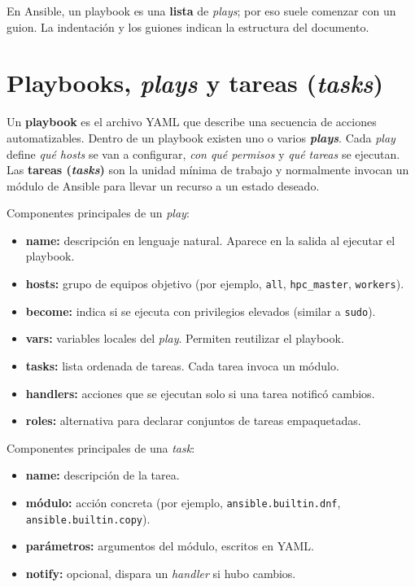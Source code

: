 En Ansible, un playbook es una \textbf{lista} de \textit{plays}; por eso suele comenzar con un guion. La indentación y los guiones indican la estructura del documento. \cite{ansible_playbooks_intro}

\section{Playbooks, \textit{plays} y tareas (\textit{tasks})}
\label{sec:ansible_playbooks_plays_tasks}

Un \textbf{playbook} es el archivo YAML que describe una secuencia de acciones automatizables. Dentro de un playbook existen uno o varios \textbf{\textit{plays}}. Cada \textit{play} define \textit{qué hosts} se van a configurar, \textit{con qué permisos} y \textit{qué tareas} se ejecutan. Las \textbf{tareas (\textit{tasks})} son la unidad mínima de trabajo y normalmente invocan un módulo de Ansible para llevar un recurso a un estado deseado. \cite{ansible_playbooks_intro,ansible_modules_intro}

Componentes principales de un \textit{play}:
\begin{itemize}
  \item \textbf{name:} descripción en lenguaje natural. Aparece en la salida al ejecutar el playbook.
  \item \textbf{hosts:} grupo de equipos objetivo (por ejemplo, \texttt{all}, \texttt{hpc\_master}, \texttt{workers}).
  \item \textbf{become:} indica si se ejecuta con privilegios elevados (similar a \texttt{sudo}).
  \item \textbf{vars:} variables locales del \textit{play}. Permiten reutilizar el playbook.
  \item \textbf{tasks:} lista ordenada de tareas. Cada tarea invoca un módulo.
  \item \textbf{handlers:} acciones que se ejecutan solo si una tarea notificó cambios.
  \item \textbf{roles:} alternativa para declarar conjuntos de tareas empaquetadas.
\end{itemize}

Componentes principales de una \textit{task}:
\begin{itemize}
  \item \textbf{name:} descripción de la tarea.
  \item \textbf{módulo:} acción concreta (por ejemplo, \texttt{ansible.builtin.dnf}, \texttt{ansible.builtin.copy}).
  \item \textbf{parámetros:} argumentos del módulo, escritos en YAML.
  \item \textbf{notify:} opcional, dispara un \textit{handler} si hubo cambios.
\end{itemize}

